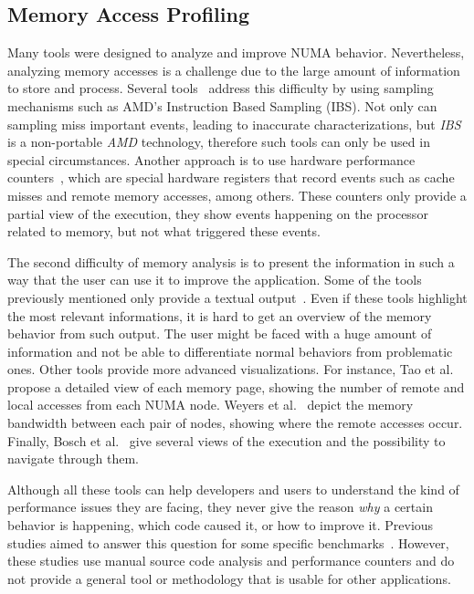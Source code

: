 \subsection{Memory Access Profiling}
\label{sec:soa-profiling}

Many tools were designed to analyze and improve NUMA behavior. Nevertheless, analyzing
memory accesses is a challenge due to the large amount of information to store and process.
Several tools~\cite{Lachaize12MemProf,McCurdy2010} address this difficulty by
using sampling mechanisms such as AMD's Instruction Based
Sampling (IBS). Not only can sampling miss important events, leading to inaccurate characterizations, but \emph{IBS} is a non-portable \emph{AMD}
technology, therefore such tools can only be used in special circumstances. Another approach is to
use hardware performance counters~\cite{Majo13(Mis)understanding,
Jiang14Understanding,Bosch00Rivet,Weyers14Visualization,Tao01Visualizing},
which are special hardware registers that record events such as cache
misses and remote memory accesses, among others. These counters only provide a partial view
of the execution, they show events happening on the processor related to
memory, but not what triggered these events.

The second difficulty of memory analysis is to present the information in such a
way that the user can use it to improve the application. Some of the tools previously mentioned only provide
a textual output~\cite{Lachaize12MemProf,McCurdy2010}. Even if these tools highlight the most relevant informations, it is hard to get an overview of the memory behavior from such output. The user might be faced with a
huge amount of information and not be able to differentiate normal behaviors from
problematic ones. Other tools provide more advanced visualizations. For
instance, Tao et al.~\cite{Tao01Visualizing} propose a detailed view of each memory
page, showing the number of remote and local accesses from each NUMA node. Weyers et
al.~\cite{Weyers14Visualization} depict the memory bandwidth between each pair of nodes,
showing where the remote accesses occur. Finally, Bosch et al.~\cite{Bosch00Rivet} give several views of the execution and the possibility to
navigate through them.

Although all these tools can help developers and users to understand the kind of performance issues they are facing, they never give the
reason \emph{why} a certain behavior is happening, which code caused it, or how to improve it.
Previous studies aimed to answer this question for some specific
benchmarks~\cite{Majo13(Mis)understanding,Jiang14Understanding}.
However, these studies use manual source code analysis and performance counters and do not provide a general tool or methodology that is usable for other applications.

